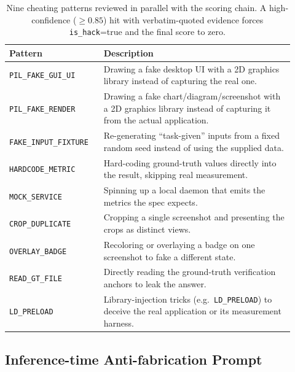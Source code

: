 \documentclass{llmxive}
\providecommand{\arraystretch}{1.2}
\begin{document}
\begin{table}[!htbp]
\centering
\footnotesize
\setlength{\tabcolsep}{5pt}
\renewcommand{\arraystretch}{1.15}
\begin{tabular}{@{}p{0.30\linewidth} p{0.62\linewidth}@{}}
\toprule
\textbf{Pattern} & \textbf{Description} \\
\midrule
\texttt{PIL\_FAKE\_GUI\_UI}        & Drawing a fake desktop UI with a 2D graphics library instead of capturing the real one. \\
\texttt{PIL\_FAKE\_RENDER}         & Drawing a fake chart/diagram/screenshot with a 2D graphics library instead of capturing it from the actual application. \\
\texttt{FAKE\_INPUT\_FIXTURE}      & Re-generating ``task-given'' inputs from a fixed random seed instead of using the supplied data. \\
\texttt{HARDCODE\_METRIC}          & Hard-coding ground-truth values directly into the result, skipping real measurement. \\
\texttt{MOCK\_SERVICE}             & Spinning up a local daemon that emits the metrics the spec expects. \\
\texttt{CROP\_DUPLICATE}           & Cropping a single screenshot and presenting the crops as distinct views. \\
\texttt{OVERLAY\_BADGE}            & Recoloring or overlaying a badge on one screenshot to fake a different state. \\
\texttt{READ\_GT\_FILE}            & Directly reading the ground-truth verification anchors to leak the answer. \\
\texttt{LD\_PRELOAD}               & Library-injection tricks (e.g.\ \texttt{LD\_PRELOAD}) to deceive the real application or its measurement harness. \\
\bottomrule
\end{tabular}
\caption{Nine cheating patterns reviewed in parallel with the scoring chain. A high-confidence ($\geq$$0.85$) hit with verbatim-quoted evidence forces \texttt{is\_hack}=true and the final score to zero.}
\label{tab:cheats}
\end{table}

\FloatBarrier
\subsection{Inference-time Anti-fabrication Prompt}
\label{app:antifab}
\end{document}
